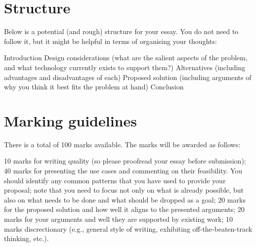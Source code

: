 \documentclass[12pt,twoside,a4paper]{article}
\begin{document}
\section{Structure}

Below is a potential (and rough) structure for your essay. You do not need to follow it, but it might be helpful in terms of organising your thoughts:

    Introduction
    Design considerations (what are the salient aspects of the problem, and what technology currently exists to support them?)
    Alternatives (including advantages and disadvantages of each)
    Proposed solution (including arguments of why you think it best fits the problem at hand)
    Conclusion

\section{Marking guidelines}

There is a total of 100 marks available. The marks will be awarded as follows:

    10 marks for writing quality (so please proofread your essay before submission);
    40 marks for presenting the use cases and commenting on their feasibility. You should identify any common patterns that you have used to provide your proposal; note that you need to focus not only on what is already possible, but also on what needs to be done and what should be dropped as a goal;
    20 marks for the proposed solution and how well it aligns to the presented arguments;
    20 marks for your arguments and well they are supported by existing work;
    10 marks discrectionary (e.g., general style of writing, exhibiting off-the-beaten-track thinking, etc.).
\end{document}
